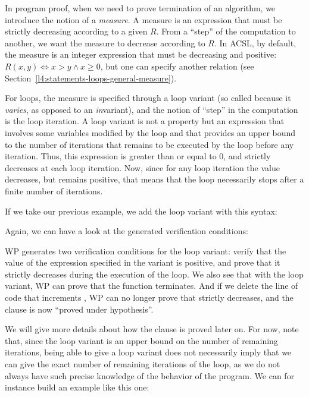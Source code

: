 In program proof, when we need to prove termination of an algorithm, we
introduce the notion of a \textit{measure}. A measure is an expression that must be
strictly decreasing according to a given
$R$. From a ``step'' of the computation to another, we want the measure to
decrease according to $R$. In ACSL, by default, the measure is an integer
expression that must be decreasing and positive:
$R(x,y) \Leftrightarrow x > y \wedge x \geq 0$, but one can specify another
relation (see Section~\ref{l4:statements-loops-general-measure}).


For loops, the measure is specified through a loop variant
(so called because it \textit{varies}, as opposed to an \textit{in}variant), and the notion of
``step'' in the computation is the loop iteration. A loop variant is not a
property but an expression that involves some variables modified
by the loop and that provides an upper bound to the number of iterations that
remains to be executed by the loop before any iteration. Thus, this expression
is greater than or equal to 0, and strictly decreases at each loop iteration. Now,
since for any loop iteration the value decreases, but remains positive, that
means that the loop necessarily stops after a finite number of iterations.


If we take our previous example, we add the loop variant with this
syntax:




Again, we can have a look at the generated verification conditions:




WP generates two verification conditions for the loop variant: verify that the
value of the expression specified in the variant is positive, and prove that it
strictly decreases during the execution of the loop. We also see that with the
loop variant, WP can prove that the function terminates. And if we delete the
line of code that increments , WP can no longer prove that
 strictly decreases, and the  clause
is now ``proved under hypothesis''.




We will give more details about how the  clause is proved
later on. For now, note that, since the loop variant is an upper bound on the
number of remaining iterations, being able to give a loop variant does not
necessarily imply that we can give the exact number of remaining iterations of
the loop, as we do not always have such precise knowledge of the behavior of the
program. We can for instance build an example like this one:


